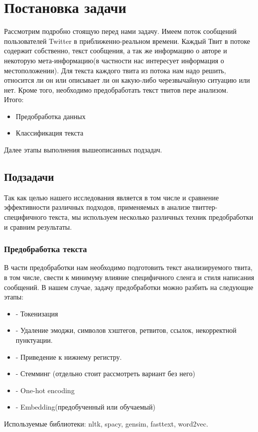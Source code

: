 
\section{Постановка задачи}
Рассмотрим подробно стоящую перед нами задачу. Имеем поток сообщений пользователей Twitter в приближенно-реальном времени. Каждый Твит в потоке содержит собственно, текст сообщения, а так же информацию о авторе и некоторую мета-информацию(в частности нас интересует информация о местоположении). Для текста каждого твита из потока нам надо решить, относится ли он или описывает ли он какую-либо черезвычайную ситуацию или нет. Кроме того, необходимо предобработать текст твитов пере анализом.\\
Итого:
\begin{itemize}
\item Предобработка данных
\item Классификация текста
\end{itemize}
Далее этапы выполнения вышеописанных подзадач. 
\subsection{Подзадачи}
Так как целью нашего исследования является в том числе и сравнение эффективности различных подходов, применяемых в анализе твиттер-специфичного текста, мы используем несколько различных техник предобработки и сравним результаты.
\subsubsection{Предобработка текста}
В части предобработки нам необходимо подготовить текст анализируемого твита, в том числе, свести к минимуму влияние специфичного сленга и стиля написания сообщений. В нашем случае, задачу предобработки можно разбить на следующие этапы:
\begin{itemize}
\item - Токенизация
\item - Удаление эмоджи, символов хэштегов, ретвитов, ссылок, некорректной пунктуации.
\item - Приведение к нижнему регистру.
\item - Стемминг (отдельно стоит рассмотреть вариант без него)
\item - One-hot encoding
\item - Embedding(предобученный или обучаемый)
\end{itemize}
Используемые библиотеки: nltk\cite{nltk}, spacy\cite{spacy}, gensim\cite{gensim}, fasttext\cite{fasttext}, word2vec\cite{w2v}.
